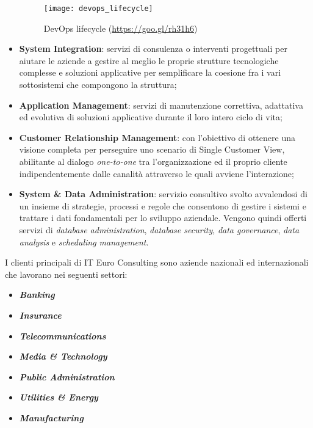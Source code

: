\begin{itemize}
	\begin{figure}[!h] 
		\centering 
		\texttt{[image: devops\_lifecycle]} 
		\caption{DevOps lifecycle (\href{https://goo.gl/rh31h6}{https://goo.gl/rh31h6})}
	\end{figure}
	\newpage
	\item \textbf{System Integration}: servizi di consulenza o interventi progettuali per aiutare le aziende a gestire al meglio le proprie strutture tecnologiche complesse e soluzioni applicative per semplificare la coesione fra i vari sottosistemi che compongono la struttura;
	\item \textbf{Application Management}: servizi di manutenzione correttiva, adattativa ed evolutiva di soluzioni applicative durante il loro intero ciclo di vita;
	\item \textbf{Customer Relationship Management}: con l'obiettivo di ottenere una visione completa per perseguire uno scenario di \gls{Single Customer View}, abilitante al dialogo \textit{one-to-one} tra l'organizzazione ed il proprio cliente indipendentemente dalle canalità attraverso le quali avviene l'interazione;
	\item \textbf{System \& Data Administration}: servizio consultivo svolto avvalendosi di un insieme di strategie, processi e regole che consentono di gestire i sistemi e trattare i dati fondamentali per lo sviluppo aziendale. Vengono quindi offerti servizi di \textit{database administration}, \textit{database security}, \textit{data governance}, \textit{data analysis} e \textit{scheduling management}.
\end{itemize}

I clienti principali di IT Euro Consulting sono aziende nazionali ed internazionali che lavorano nei seguenti settori:
\begin{itemize}
	\item \textit{\textbf{Banking}}
	\item \textit{\textbf{Insurance}}
	\item \textit{\textbf{Telecommunications}}
	\item \textit{\textbf{Media \& Technology}}
	\item \textit{\textbf{Public Administration}}
	\item \textit{\textbf{Utilities \& Energy}}
	\item \textit{\textbf{Manufacturing}}
\end{itemize}

